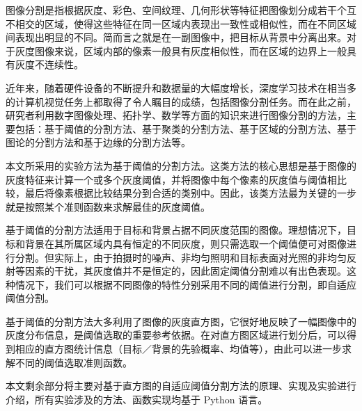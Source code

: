
图像分割是指根据灰度、彩色、空间纹理、几何形状等特征把图像划分成若干个互不相交的区域，使得这些特征在同一区域内表现出一致性或相似性，而在不同区域间表现出明显的不同。简而言之就是在一副图像中，把目标从背景中分离出来。对于灰度图像来说，区域内部的像素一般具有灰度相似性，而在区域的边界上一般具有灰度不连续性。 

近年来，随着硬件设备的不断提升和数据量的大幅度增长，深度学习技术在相当多的计算机视觉任务上都取得了令人瞩目的成绩，包括图像分割任务。而在此之前，研究者利用数字图像处理、拓扑学、数学等方面的知识来进行图像分割的方法，主要包括：基于阈值的分割方法、基于聚类的分割方法、基于区域的分割方法、基于图论的分割方法和基于边缘的分割方法等。

本文所采用的实验方法为基于阈值的分割方法。这类方法的核心思想是基于图像的灰度特征来计算一个或多个灰度阈值，并将图像中每个像素的灰度值与阈值相比较，最后将像素根据比较结果分到合适的类别中。因此，该类方法最为关键的一步就是按照某个准则函数来求解最佳的灰度阈值。

基于阈值的分割方法适用于目标和背景占据不同灰度范围的图像。理想情况下，目标和背景在其所属区域内具有恒定的不同灰度，则只需选取一个阈值便可对图像进行分割。但实际上，由于拍摄时的噪声、非均匀照明和目标表面对光照的非均匀反射等因素的干扰，其灰度值并不是恒定的，因此固定阈值分割难以有出色表现。这种情况下，我们可以根据不同图像的特性分别采用不同的阈值进行分割，即自适应阈值分割。

基于阈值的分割方法大多利用了图像的灰度直方图，它很好地反映了一幅图像中的灰度分布信息，是阈值选取的重要参考依据。在对直方图区域进行划分后，可以得到相应的直方图统计信息（目标／背景的先验概率、均值等），由此可以进一步求解不同的阈值选取准则函数。

本文剩余部分将主要对基于直方图的自适应阈值分割方法的原理、实现及实验进行介绍，所有实验涉及的方法、函数实现均基于 Python 语言。

